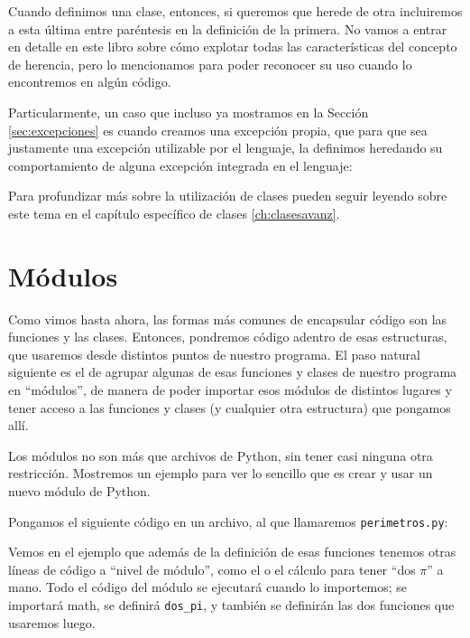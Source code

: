 Cuando definimos una clase, entonces, si queremos que herede de otra incluiremos a esta última entre paréntesis en la definición de la primera. No vamos a entrar en detalle en este libro sobre cómo explotar todas las características del concepto de herencia, pero lo mencionamos para poder reconocer su uso cuando lo encontremos en algún código.

Particularmente, un caso que incluso ya mostramos en la Sección \ref{sec:excepciones} es cuando creamos una excepción propia, que para que sea justamente una excepción utilizable por el lenguaje, la definimos heredando su comportamiento de alguna excepción integrada en el lenguaje:


Para profundizar más sobre la utilización de clases pueden seguir leyendo sobre este tema en el capítulo específico de clases \ref{ch:clasesavanz}.


\section{Módulos}\label{sec:modulos}

Como vimos hasta ahora, las formas más comunes de encapsular código son las funciones y las clases. Entonces, pondremos código adentro de esas estructuras, que usaremos desde distintos puntos de nuestro programa. El paso natural siguiente es el de agrupar algunas de esas funciones y clases de nuestro programa en ``módulos'', de manera de poder importar esos módulos de distintos lugares y tener acceso a las funciones y clases (y cualquier otra estructura) que pongamos allí.

Los módulos no son más que archivos de Python, sin tener casi ninguna otra restricción. Mostremos un ejemplo para ver lo sencillo que es crear y usar un nuevo módulo de Python.

Pongamos el siguiente código en un archivo, al que llamaremos \texttt{perimetros.py}:


Vemos en el ejemplo que además de la definición de esas funciones tenemos otras líneas de código a ``nivel de módulo'', como el  o el cálculo para tener ``dos $\pi$'' a mano. Todo el código del módulo se ejecutará cuando lo importemos; se importará math, se definirá \texttt{dos\_pi}, y también se definirán las dos funciones que usaremos luego.

